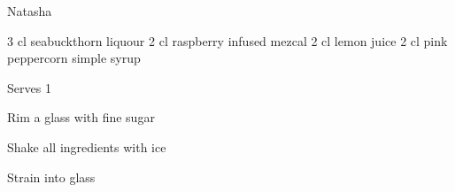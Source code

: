 
\begin{recipe}{Natasha}{}
\begin{ingredients}
3 cl seabuckthorn liquour
2 cl raspberry infused mezcal
2 cl lemon juice
2 cl pink peppercorn simple syrup
\end{ingredients}
\nextcolumn
Serves 1
\begin{steps}
    \item Rim a glass with fine sugar
    \item Shake all ingredients with ice
    \item Strain into glass
\end{steps}
\end{recipe}